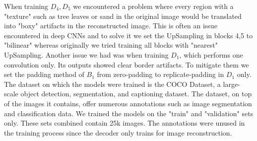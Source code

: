 When training $D_4, D_5$ we encountered a problem where every region with a "texture" such as tree leaves or sand in the original image would be translated into "boxy" artifacts in the reconstructed image. This is often an issue encountered in deep CNNs and to solve it we set the UpSampling in blocks 4,5 to "bilinear" whereas originally we tried training all blocks with "nearest" UpSampling. Another issue we had was when training $D_1$, which performs one convolution only. Its outputs showed clear border artifacts. To mitigate them we set the padding method of $B_1$ from zero-padding to replicate-padding in $D_1$ only.\\

The dataset on which the models were trained is the COCO Dataset, a large-scale object detection, segmentation, and captioning dataset. The dataset, on top of the images it contains, offer numerous annotations such as image segmentation and classification data. We trained the models on the "train" and "validation" sets only. These sets combined contain 25k images. The annotations were unused in the training process since the decoder only trains for image reconstruction.